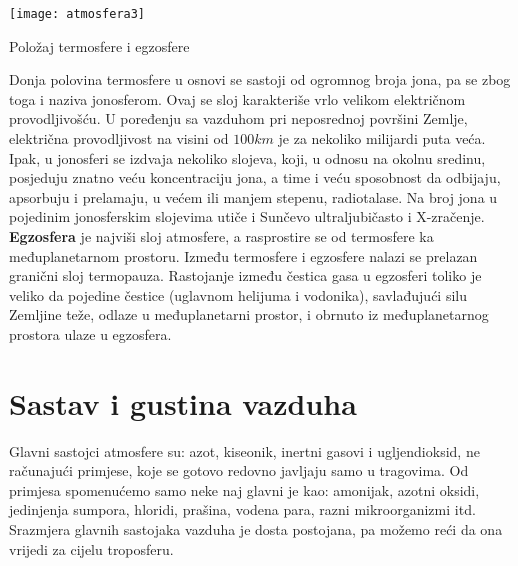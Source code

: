 	\begin{marginfigure}%
	\texttt{[image: atmosfera3]}
	\caption{Položaj termosfere i egzosfere}
	\label{fig:atmosfera3}
	\end{marginfigure}
Donja polovina termosfere u osnovi se sastoji od ogromnog broja jona, pa se zbog toga i naziva jonosferom. Ovaj se sloj karakteriše vrlo velikom električnom provodljivošću. U poređenju sa vazduhom pri neposrednoj površini Zemlje, električna provodljivost na visini od $100km$ je za nekoliko milijardi puta veća. Ipak, u jonosferi se izdvaja nekoliko slojeva, koji, u odnosu na okolnu sredinu, posjeduju znatno veću koncentraciju jona, a time i veću sposobnost da odbijaju, apsorbuju i prelamaju, u većem ili manjem stepenu, radiotalase. Na broj jona u pojedinim jonosferskim slojevima utiče i Sunčevo ultraljubičasto i X-zračenje. \\

\textbf{Egzosfera} je najviši sloj atmosfere, a rasprostire se od termosfere ka međuplanetarnom prostoru. Između termosfere i egzosfere nalazi se prelazan granični sloj termopauza. Rastojanje između čestica gasa u egzosferi toliko je veliko da pojedine čestice (uglavnom helijuma i vodonika), savlađujući silu Zemljine teže, odlaze u međuplanetarni prostor, i obrnuto  iz međuplanetarnog prostora ulaze u egzosfera.


\section{Sastav i gustina vazduha}


Glavni sastojci atmosfere su: azot, kiseonik, inertni gasovi i ugljendioksid, ne računajući primjese, koje se gotovo redovno javljaju samo u tragovima. Od primjesa spomenućemo samo neke naj glavni je kao: amonijak, azotni oksidi, jedinjenja sumpora, hloridi, prašina, vodena para, razni mikroorganizmi itd.
Srazmjera glavnih sastojaka vazduha je dosta postojana, pa možemo reći da ona vrijedi za cijelu troposferu.

